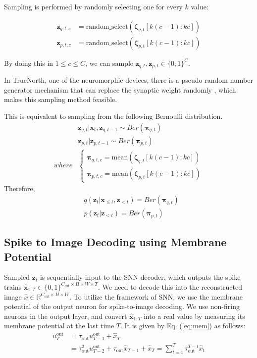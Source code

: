 \documentclass[letterpaper]{article} %
\begin{document}
Sampling is performed by randomly selecting one for every $k$ value:

\begin{align}
    \bm{z}_{q,t,c} &= \mathrm{random\_select}(\bm{\zeta}_{q,t}[k(c-1):kc]) \\
    \bm{z}_{p,t,c} &= \mathrm{random\_select}(\bm{\zeta}_{p,t}[k(c-1):kc])
\end{align}

By doing this in $1\leq c\leq C$, we can sample $\bm{z}_{q,t},\bm{z}_{p,t} \in \{0,1\}^{C}$.

In TrueNorth, one of the neuromorphic devices, there is a pseudo random number generator mechanism that can replace the synaptic weight randomly \cite{truenorthrandom}, which makes this sampling method feasible.

This is equivalent to sampling from the following Bernoulli distribution.
\begin{align}
    &\bm{z}_{q,t} | \bm{x}_t, \bm{z}_{q,t-1} \sim Ber(\bm{\pi}_{q,t}) \\
     &\bm{z}_{p,t} | \bm{z}_{p,t-1} \sim Ber(\bm{\pi}_{p,t}) \\
         where&  \left\{
                \begin{array}{ll}
                \bm{\pi}_{q,t,c}=\mathrm{mean}(\bm{\zeta}_{q,t}[k(c-1):kc])\\
                \bm{\pi}_{p,t,c}=\mathrm{mean}(\bm{\zeta}_{p,t}[k(c-1):kc])
                \end{array}
                \right.
\end{align}
Therefore, 
\begin{align}
&q(\bm{z}_t | \bm{x}_{\leq t}, \bm{z}_{<t})=Ber(\bm{\pi}_{q,t}) \\
&p(\bm{z}_t | \bm{z}_{<t})=Ber(\bm{\pi}_{p,t})
\end{align}

\subsection{Spike to Image Decoding using Membrane Potential}

Sampled $\bm{z}_t$ is sequentially input to the SNN decoder, which outputs the spike trains $\hat{\bm{x}}_{1:T} \in \{0,1\}^{C_{\mathrm{out}}\times H\times W\times T}$. We need to decode this into the reconstructed image $\hat{x}\in \mathbb{R}^{C_{\mathrm{out}}\times H\times W}$. To utilize the framework of SNN, we use the membrane potential of the output neuron for spike-to-image decoding. We use non-firing neurons in the output layer, and convert $\hat{\bm{x}}_{1:T}$ into a real value by measuring its membrane potential at the last time $T$. It is given by Eq. (\ref{eq:mem}) as follows:
\begin{align}
    u_T^{\mathrm{out}} &= \tau_{\mathrm{out}} u_{T-1}^{\mathrm{out}} + \hat{x}_T\nonumber \\
        &= \tau_{\mathrm{out}}^2 u_{T-2}^{\mathrm{out}} + \tau_{\mathrm{out}} \hat{x}_{T-1} + \hat{x}_T = \sum_{t=1}^{T} \tau_{\mathrm{out}}^{T-t} \hat{x}_t \label{eq:stidecode}
\end{align}
\end{document}
